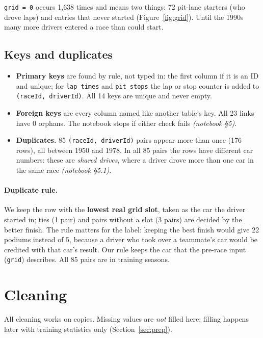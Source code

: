 \documentclass[11pt,a4paper]{article}
\newcommand{\code}[1]{\texttt{#1}}
\newcommand{\fig}[1]{Figure~\ref{#1}}
\newcommand{\nb}[1]{\textit{(notebook \S#1)}}
\begin{document}
\code{grid = 0} occurs 1{,}638 times and means two things: 72 pit-lane starters (who drove laps) and entries that never started (\fig{fig:grid}). Until the 1990s many more drivers entered a race than could start.

\subsection{Keys and duplicates}
\begin{itemize}
\item \textbf{Primary keys} are found by rule, not typed in: the first column if it is an ID and unique; for \code{lap\_times} and \code{pit\_stops} the lap or stop counter is added to \code{(raceId, driverId)}. All 14 keys are unique and never empty.
\item \textbf{Foreign keys} are every column named like another table's key. All 23 links have 0 orphans. The notebook stops if either check fails \nb{5}.
\item \textbf{Duplicates.} 85 \code{(raceId, driverId)} pairs appear more than once (176 rows), all between 1950 and 1978. In all 85 pairs the rows have different car numbers: these are \emph{shared drives}, where a driver drove more than one car in the same race \nb{5.1}.
\end{itemize}

\paragraph{Duplicate rule.} We keep the row with the \textbf{lowest real grid slot}, taken as the car the driver started in; ties (1 pair) and pairs without a slot (3 pairs) are decided by the better finish. The rule matters for the label: keeping the best finish would give 22 podiums instead of 5, because a driver who took over a teammate's car would be credited with that car's result. Our rule keeps the car that the pre-race input (\code{grid}) describes. All 85 pairs are in training seasons.

\section{Cleaning}

All cleaning works on copies. Missing values are \emph{not} filled here; filling happens later with training statistics only (Section~\ref{sec:prep}).
\end{document}
